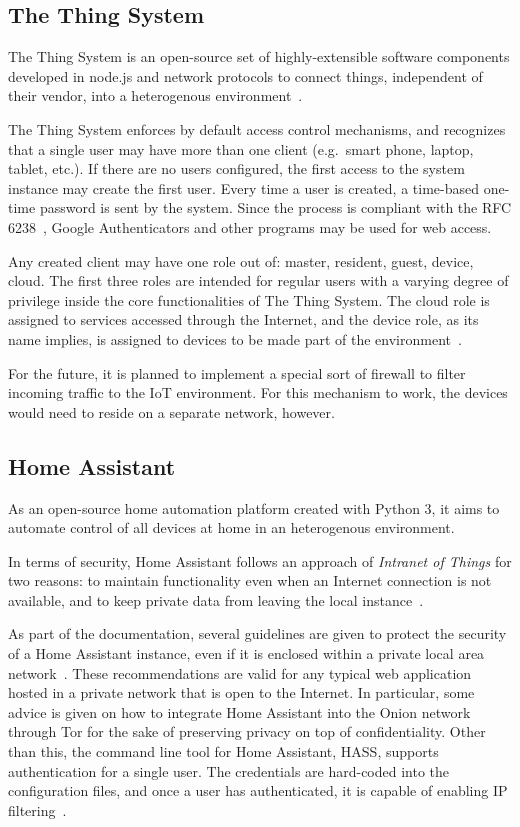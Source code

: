 \documentclass[12pt]{article}
\begin{document}
\subsection{The Thing System}

The Thing System is an open-source set of highly-extensible software components developed in node.js and network protocols to connect things, independent of their vendor, into a heterogenous environment~\cite{related_08}.

The Thing System enforces by default access control mechanisms, and recognizes that a single user may have more than one client (e.g.\ smart phone, laptop, tablet, etc.). If there are no users configured, the first access to the system instance may create the first user. Every time a user is created, a time-based one-time password is sent by the system. Since the process is compliant with the RFC 6238~\cite{RFC6238}, Google Authenticators and other programs may be used for web access.

Any created client may have one role out of: master, resident, guest, device, cloud. The first three roles are intended for regular users with a varying degree of privilege inside the core functionalities of The Thing System. The cloud role is assigned to services accessed through the Internet, and the device role, as its name implies, is assigned to devices to be made part of the environment~\cite{related_08}. 

For the future, it is planned to implement a special sort of firewall to filter incoming traffic to the IoT environment. For this mechanism to work, the devices would need to reside on a separate network, however.

\subsection{Home Assistant}

As an open-source home automation platform created with Python 3, it aims to automate control of all devices at home in an heterogenous environment.

In terms of security, Home Assistant follows an approach of \emph{Intranet of Things} for two reasons: to maintain functionality even when an Internet connection is not available, and to keep private data from leaving the local instance~\cite{related_11}.

As part of the documentation, several guidelines are given to protect the security of a Home Assistant instance, even if it is enclosed within a private local area network~\cite{related_12}. These recommendations are valid for any typical web application hosted in a private network that is open to the Internet. In particular, some advice is given on how to integrate Home Assistant into the Onion network through Tor for the sake of preserving privacy on top of confidentiality. Other than this, the command line tool for Home Assistant, HASS, supports authentication for a single user. The credentials are hard-coded into the configuration files, and once a user has authenticated, it is capable of enabling IP filtering~\cite{related_10}.
\end{document}
